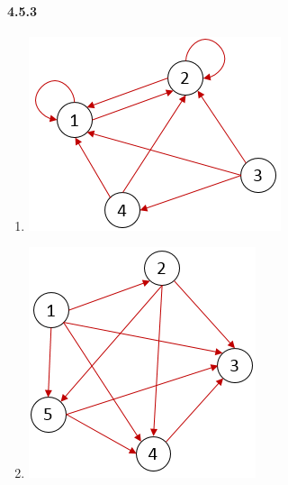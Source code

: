 \documentclass[11pt, letterpaper, twocolumn, fleqn]{article}
\begin{document}
    \paragraph{4.5.3}
        \begin{enumerate}
            \item \includegraphics[scale=.7]{453a}
            \item \includegraphics[scale=.7]{453b}
        \end{enumerate}
    
\end{document}
